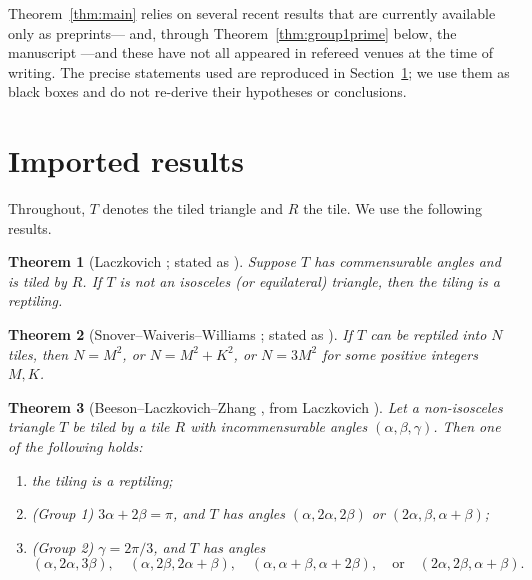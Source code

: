 \documentclass[11pt]{amsart}
\newtheorem{theorem}{Theorem}
\theoremstyle{remark}
\begin{document}
Theorem~\ref{thm:main} relies on several recent results that are currently available only as preprints---\cite{BLZ633,BZRat,BeesonPrime} and, through Theorem~\ref{thm:group1prime} below, the manuscript \cite{Beeson2229}---and these have not all appeared in refereed venues at the time of writing. The precise statements used are reproduced in Section~\ref{sec:imports}; we use them as black boxes and do not re-derive their hypotheses or conclusions.

\section{Imported results}\label{sec:imports}

Throughout, $T$ denotes the tiled triangle and $R$ the tile. We use the following results.

\begin{theorem}[{Laczkovich \cite{Lacz95,Lacz12}; stated as \cite[Theorem~3]{BLZ633}}]\label{thm:commensurable}
Suppose $T$ has commensurable angles and is tiled by $R$. If $T$ is not an isosceles (or equilateral) triangle, then the tiling is a reptiling.
\end{theorem}

\begin{theorem}[{Snover--Waiveris--Williams \cite{SWW91}; stated as \cite[Theorem~4]{BLZ633}}]\label{thm:reptile}
If $T$ can be reptiled into $N$ tiles, then $N=M^2$, or $N=M^2+K^2$, or $N=3M^2$ for some positive integers $M,K$.
\end{theorem}

\begin{theorem}[{Beeson--Laczkovich--Zhang \cite[Theorem~9]{BLZ633}, from Laczkovich \cite[Theorem~4.1]{Lacz95}}]\label{thm:classification}
Let a non-isosceles triangle $T$ be tiled by a tile $R$ with incommensurable angles $(\alpha,\beta,\gamma)$. Then one of the following holds:
\begin{enumerate}
\item the tiling is a reptiling;
\item \textup{(Group 1)} $3\alpha+2\beta=\pi$, and $T$ has angles $(\alpha,2\alpha,2\beta)$ or $(2\alpha,\beta,\alpha+\beta)$;
\item \textup{(Group 2)} $\gamma=2\pi/3$, and $T$ has angles
\[
(\alpha,2\alpha,3\beta),\quad
(\alpha,2\beta,2\alpha+\beta),\quad
(\alpha,\alpha+\beta,\alpha+2\beta),\quad\text{or}\quad
(2\alpha,2\beta,\alpha+\beta).
\]
\end{enumerate}
\end{theorem}
\end{document}
